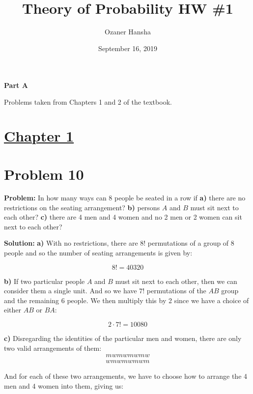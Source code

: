 \documentclass{article}
\begin{document}
\title{Theory of Probability HW \#1}
\author{Ozaner Hansha}
\date{September 16, 2019}
\maketitle

\begin{center}
    \Large{\textbf{Part A}}
\end{center}
Problems taken from Chapters 1 and 2 of the textbook.

\section*{\underline{Chapter 1}}

\section*{Problem 10}
\noindent\textbf{Problem:} In how many ways can 8 people be seated in a row if \textbf{a)} there are no restrictions on the seating arrangement? \textbf{b)} persons $A$ and $B$ must sit next to each other? \textbf{c)} there are 4 men and 4 women and no 2 men or 2 women can sit next to each other?
\bigskip

\noindent\textbf{Solution:} \textbf{a)} With no restrictions, there are $8!$ permutations of a group of 8 people and so the number of seating arrangements is given by:

\begin{equation*}
    8!=40320
\end{equation*}

\textbf{b)} If two particular people $A$ and $B$ must sit next to each other, then we can consider them a single unit. And so we have $7!$ permutations of the $AB$ group and the remaining 6 people. We then multiply this by 2 since we have a choice of either $AB$ or $BA$:

\begin{equation*}
    2\cdot 7!=10080
\end{equation*}

\textbf{c)} Disregarding the identities of the particular men and women, there are only two valid arrangements of them:
\begin{gather*}
    mwmwmwmw\\
    wmwmwmwm
\end{gather*}

And for each of these two arrangements, we have to choose how to arrange the 4 men and 4 women into them, giving us:
\end{document}
